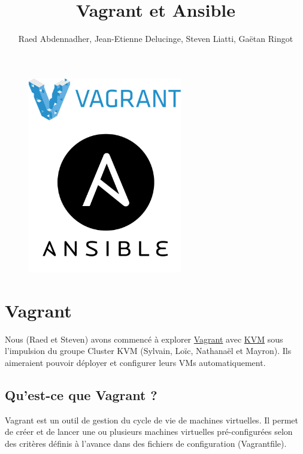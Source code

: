 \documentclass[a4paper, 12pt]{article}
\begin{document}
\title{Vagrant et Ansible}
\author{Raed Abdennadher, Jean-Etienne Delucinge, Steven Liatti, Gaëtan Ringot}
\maketitle

\begin{figure}
	\begin{center}
		\includegraphics[width=0.6\textwidth]{intro.jpg}
	\end{center}
\end{figure}
\newpage

\tableofcontents
\renewcommand\listoflistingscaption{Table des scripts de code}
\listoflistings

\newpage


\section{Vagrant}
Nous (Raed et Steven) avons commencé à explorer \href{https://www.vagrantup.com/}{Vagrant} avec
\href{https://www.linux-kvm.org/page/Main_Page}{KVM} sous l'impulsion du groupe Cluster KVM
(Sylvain, Loïc, Nathanaël et Mayron). Ils aimeraient pouvoir déployer et configurer leurs VMs automatiquement.

\subsection{Qu'est-ce que Vagrant ?}
Vagrant est un outil de gestion du cycle de vie de machines virtuelles.
Il permet de créer et de lancer une ou plusieurs machines virtuelles pré-configurées
selon des critères définis à l'avance dans des fichiers de configuration (Vagrantfile).
\end{document}
